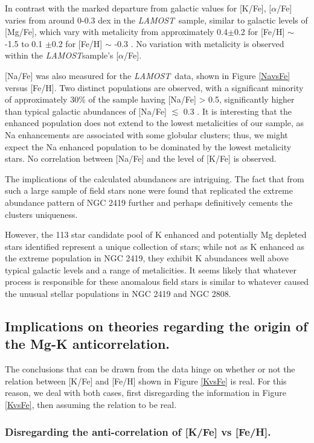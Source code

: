 \documentclass[a4paper,fleqn,usenatbib]{mnras}
\newcommand{\project}[1]{\emph{#1}}
\newcommand{\lamost}{\project{LAMOST}}
\begin{document}
In contrast with the marked departure from galactic values for [K/Fe], [$\alpha$/Fe] varies from around 0-0.3 dex in the \lamost \ sample, similar to galactic levels of [Mg/Fe], which vary with metalicity from approximately 0.4$\pm$0.2 for [Fe/H] $\sim$ -1.5 to 0.1 $\pm$0.2 for [Fe/H] $\sim$ -0.3 \citep{kobayashi2011}. No variation with metalicity is observed within the \lamost sample's [$\alpha$/Fe].

[Na/Fe] was also measured for the \lamost\ data, shown in Figure \ref{NavsFe} versus [Fe/H]. Two distinct populations are observed, with a significant minority of approximately 30\% of the sample having [Na/Fe] > 0.5, significantly higher than typical galactic abundances of [Na/Fe] $\lesssim$ 0.3 \citep{kobayashi2011}. It is interesting that the enhanced population does not extend to the lowest metalicities of our sample, as Na enhancements are associated with some globular clusters; thus, we might expect the Na enhanced population to be dominated by the lowest metalicity stars. No correlation between [Na/Fe] and the level of [K/Fe] is observed.

The implications of the calculated abundances are intriguing. The fact that from such a large sample of field stars none were found that replicated the extreme abundance pattern of NGC 2419 further and perhaps definitively cements the clusters uniqueness.

However, the 113 star candidate pool of K enhanced and potentially Mg depleted stars identified represent a unique collection of stars; while not as K enhanced as the extreme population in NGC 2419, they exhibit K abundances well above typical galactic levels and a range of metalicities. It seems likely that whatever process is responsible for these anomalous field stars is similar to whatever caused the unusual stellar populations in NGC 2419 and NGC 2808.

\subsection{Implications on theories regarding the origin of the Mg-K anticorrelation.}

The conclusions that can be drawn from the data hinge on whether or not the relation between [K/Fe] and [Fe/H] shown in Figure \ref{KvsFe} is real. For this reason, we deal with both cases, first disregarding the information in Figure \ref{KvsFe}, then assuming the relation to be real.

\subsubsection{Disregarding the anti-correlation of [K/Fe] vs [Fe/H].}
\end{document}
